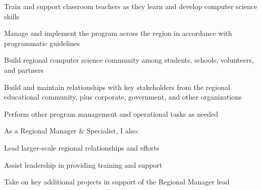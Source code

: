 \begin{cventries}
{\begin{cvitems}
\begin{cvitems}
		\item Train and support classroom teachers as they learn and develop computer science skills
	\end{cvitems}
	\vspace{2mm}
	\item Manage and implement the program across the region in accordance with programmatic guidelines\\
		\begin{cvitems}
		\item Build regional computer science community among students, schools, volunteers, and partners
		\item Build and maintain relationships with key stakeholders from the regional educational community, plus corporate, government, and other organizations
		\item Perform other program management and operational tasks as needed
	\end{cvitems}
	\vspace{2mm}
	\item As a Regional Manager \& Specialist, I also:\\
		\begin{cvitems}
		\item Lead larger-scale regional relationships and efforts
		\item Assist leadership in providing training and support
		\item Take on key additional projects in support of the Regional Manager lead
		\end{cvitems}
      \end{cvitems}
    }


\end{cventries}
